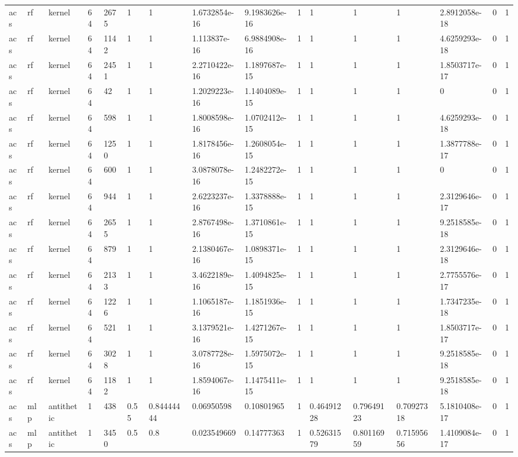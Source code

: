 \begin{tabular}{llllllllllllllll}
acs & rf & kernel & 64 & 2675 & 1 & 1 & 1.6732854e-16 & 9.1983626e-16 & 1 & 1 & 1 & 1 & 2.8912058e-18 & 0 & 1 \\
acs & rf & kernel & 64 & 1142 & 1 & 1 & 1.113837e-16 & 6.9884908e-16 & 1 & 1 & 1 & 1 & 4.6259293e-18 & 0 & 1 \\
acs & rf & kernel & 64 & 2451 & 1 & 1 & 2.2710422e-16 & 1.1897687e-15 & 1 & 1 & 1 & 1 & 1.8503717e-17 & 0 & 1 \\
acs & rf & kernel & 64 & 42 & 1 & 1 & 1.2029223e-16 & 1.1404089e-15 & 1 & 1 & 1 & 1 & 0 & 0 & 1 \\
acs & rf & kernel & 64 & 598 & 1 & 1 & 1.8008598e-16 & 1.0702412e-15 & 1 & 1 & 1 & 1 & 4.6259293e-18 & 0 & 1 \\
acs & rf & kernel & 64 & 1250 & 1 & 1 & 1.8178456e-16 & 1.2608054e-15 & 1 & 1 & 1 & 1 & 1.3877788e-17 & 0 & 1 \\
acs & rf & kernel & 64 & 600 & 1 & 1 & 3.0878078e-16 & 1.2482272e-15 & 1 & 1 & 1 & 1 & 0 & 0 & 1 \\
acs & rf & kernel & 64 & 944 & 1 & 1 & 2.6223237e-16 & 1.3378888e-15 & 1 & 1 & 1 & 1 & 2.3129646e-17 & 0 & 1 \\
acs & rf & kernel & 64 & 2655 & 1 & 1 & 2.8767498e-16 & 1.3710861e-15 & 1 & 1 & 1 & 1 & 9.2518585e-18 & 0 & 1 \\
acs & rf & kernel & 64 & 879 & 1 & 1 & 2.1380467e-16 & 1.0898371e-15 & 1 & 1 & 1 & 1 & 2.3129646e-18 & 0 & 1 \\
acs & rf & kernel & 64 & 2133 & 1 & 1 & 3.4622189e-16 & 1.4094825e-15 & 1 & 1 & 1 & 1 & 2.7755576e-17 & 0 & 1 \\
acs & rf & kernel & 64 & 1226 & 1 & 1 & 1.1065187e-16 & 1.1851936e-15 & 1 & 1 & 1 & 1 & 1.7347235e-18 & 0 & 1 \\
acs & rf & kernel & 64 & 521 & 1 & 1 & 3.1379521e-16 & 1.4271267e-15 & 1 & 1 & 1 & 1 & 1.8503717e-17 & 0 & 1 \\
acs & rf & kernel & 64 & 3028 & 1 & 1 & 3.0787728e-16 & 1.5975072e-15 & 1 & 1 & 1 & 1 & 9.2518585e-18 & 0 & 1 \\
acs & rf & kernel & 64 & 1182 & 1 & 1 & 1.8594067e-16 & 1.1475411e-15 & 1 & 1 & 1 & 1 & 9.2518585e-18 & 0 & 1 \\
acs & mlp & antithetic & 1 & 438 & 0.55 & 0.84444444 & 0.06950598 & 0.10801965 & 1 & 0.46491228 & 0.79649123 & 0.70927318 & 5.1810408e-17 & 0 & 1 \\
acs & mlp & antithetic & 1 & 3450 & 0.5 & 0.8 & 0.023549669 & 0.14777363 & 1 & 0.52631579 & 0.80116959 & 0.71595656 & 1.4109084e-17 & 0 & 1 \\

\end{tabular}
